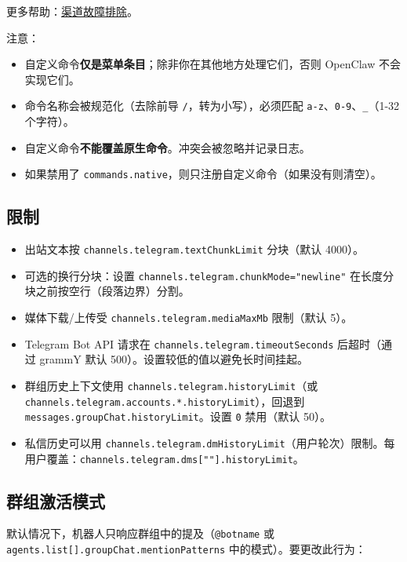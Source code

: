 更多帮助：\href{/channels/troubleshooting}{渠道故障排除}。

注意：

\begin{itemize}
  \item 自定义命令\textbf{仅是菜单条目}；除非你在其他地方处理它们，否则 OpenClaw 不会实现它们。
  \item 命令名称会被规范化（去除前导 \texttt{/}，转为小写），必须匹配 \texttt{a-z}、\texttt{0-9}、\texttt{\_}（1-32 个字符）。
  \item 自定义命令\textbf{不能覆盖原生命令}。冲突会被忽略并记录日志。
  \item 如果禁用了 \texttt{commands.native}，则只注册自定义命令（如果没有则清空）。
\end{itemize}


\subsection{限制}


\begin{itemize}
  \item 出站文本按 \texttt{channels.telegram.textChunkLimit} 分块（默认 4000）。
  \item 可选的换行分块：设置 \texttt{channels.telegram.chunkMode="newline"} 在长度分块之前按空行（段落边界）分割。
  \item 媒体下载/上传受 \texttt{channels.telegram.mediaMaxMb} 限制（默认 5）。
  \item Telegram Bot API 请求在 \texttt{channels.telegram.timeoutSeconds} 后超时（通过 grammY 默认 500）。设置较低的值以避免长时间挂起。
  \item 群组历史上下文使用 \texttt{channels.telegram.historyLimit}（或 \texttt{channels.telegram.accounts.*.historyLimit}），回退到 \texttt{messages.groupChat.historyLimit}。设置 \texttt{0} 禁用（默认 50）。
  \item 私信历史可以用 \texttt{channels.telegram.dmHistoryLimit}（用户轮次）限制。每用户覆盖：\texttt{channels.telegram.dms[""].historyLimit}。
\end{itemize}


\subsection{群组激活模式}


默认情况下，机器人只响应群组中的提及（\texttt{@botname} 或 \texttt{agents.list[].groupChat.mentionPatterns} 中的模式）。要更改此行为：

